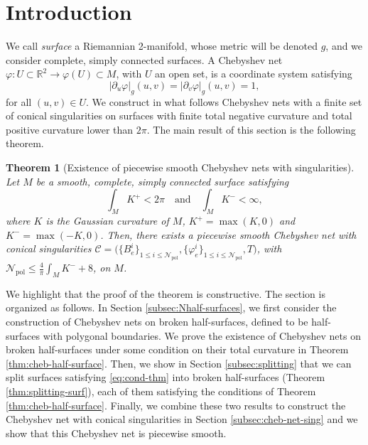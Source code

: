 \documentclass{article}
\newcommand{\R}{\mathbb{R}}
\newcommand{\surf}{M}
\newcommand{\DU}{\partial_{u}}
\newcommand{\DV}{\partial_{v}}
\newcommand{\halfP}{B}
\newcommand{\Nsing}{\mathcal{N}_{\mathrm{sing}}}
\newcommand{\Npol}{\mathcal{N}_{\mathrm{pol}}}
\newtheorem{theorem}{Theorem}
\theoremstyle{remark}
\theoremstyle{prpart}
\newcommand{\CC}{\mathcal{C}}
\begin{document}
\section{Introduction}
We call {\em surface} a Riemannian 2-manifold, whose metric will be denoted $g$, and we consider complete, simply connected surfaces. 
A Chebyshev net $\varphi:U\subset\R^2\to\varphi(U)\subset\surf$, with $U$ an open set, is a coordinate system satisfying
\begin{equation}\label{eq:cheb-def}
  |\DU\varphi|_g(u,v) = |\DV\varphi|_g(u,v) = 1,
\end{equation}
for all $(u,v)\in U$.
We construct in what follows Chebyshev nets with a finite set of conical singularities on surfaces with finite total negative curvature and total positive curvature lower than $2\pi$. The main result of this section is the following theorem.
\begin{theorem}[Existence of piecewise smooth Chebyshev nets with singularities]\label{thm:existence-cheb-net}
  Let $\surf$ be a smooth, complete, simply connected surface satisfying
\begin{equation} \label{eq:cond-thm}
  \int_{\surf}K^+<2\pi\quad\text{and}\quad\int_{\surf}K^-<\infty,
\end{equation}
where $K$ is the Gaussian curvature of $\surf$, $K^+=\max(K,0)$ and $K^-=\max(-K,0)$. %
Then, there exists a piecewise smooth Chebyshev net with conical singularities \sloppy$\CC=\big(\{\halfP^i_e\}_{1\leq i\leq \Npol}, \{\varphi^i_e\}_{1\leq i\leq \Npol}, T)$, with $\Npol\leq \frac{4}{\pi}\int_\surf K^-+8$, on $\surf$.
\end{theorem}
We highlight that the proof of the theorem is constructive. %
The section is organized as follows. In Section \ref{subsec:Nhalf-surfaces}, we first consider the construction of Chebyshev nets on broken half-surfaces, defined to be half-surfaces with polygonal boundaries. We prove the existence of Chebyshev nets on broken half-surfaces under some condition on their total curvature in Theorem \ref{thm:cheb-half-surface}. Then, we show in Section \ref{subsec:splitting} that we can split surfaces satisfying \eqref{eq:cond-thm} into broken half-surfaces (Theorem \ref{thm:splitting-surf}), each of them satisfying the conditions of Theorem \ref{thm:cheb-half-surface}. Finally, we combine these two results to construct the Chebyshev net with conical singularities in Section \ref{subsec:cheb-net-sing} and we show that this Chebyshev net is piecewise smooth.
\end{document}
